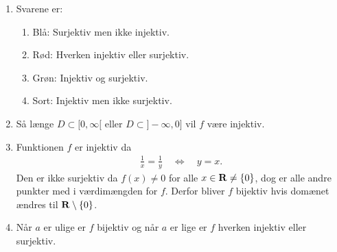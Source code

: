 \begin{enumerate}
	\item \label{it:fun1ans} Svarene er:
	\begin{enumerate}
		\item Blå: Surjektiv men ikke injektiv.
		\item Rød: Hverken injektiv eller surjektiv.
		\item Grøn: Injektiv og surjektiv.
		\item Sort: Injektiv men ikke surjektiv.
	\end{enumerate}

	\item Så længe $D\subset [0,\infty[$ eller $D\subset ]-\infty,0]$ vil $f$ være injektiv.
	
	\item \label{it:fun2ans} Funktionen $f$ er injektiv da 
	\begin{align*}
	\frac{1}{x}=\frac{1}{y}\quad\Leftrightarrow\quad y=x.
	\end{align*}
	Den er ikke surjektiv da $f(x)\neq 0$ for alle $x\in \mathbf{R}\neq \{0\}$, dog er alle andre punkter med i værdimængden for $f$. Derfor bliver $f$ bijektiv hvis domænet ændres til $\mathbf{R}\setminus\{0\}$.
	

	\item Når $a$ er ulige er $f$ bijektiv og når $a$ er lige er $f$ hverken injektiv eller surjektiv.
	

\end{enumerate}
